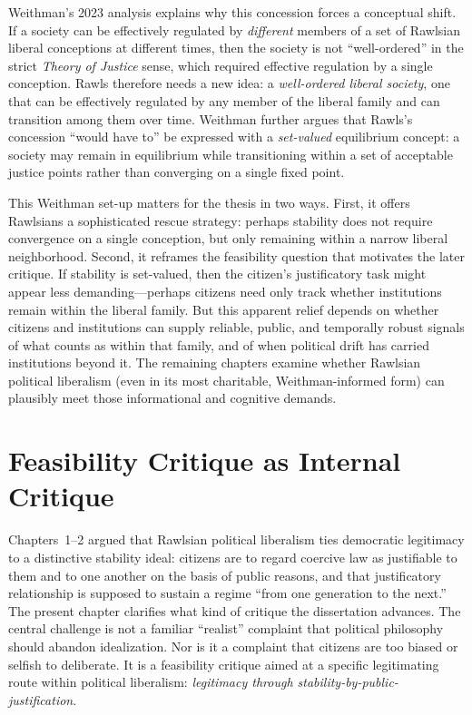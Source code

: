 \documentclass[12pt]{report}
\begin{document}
Weithman's 2023 analysis explains why this concession forces a conceptual shift. If a society can be effectively regulated by \emph{different} members of a set of Rawlsian liberal conceptions at different times, then the society is not ``well-ordered'' in the strict \emph{Theory of Justice} sense, which required effective regulation by a single conception.\parencite[p.~205]{Weithman2023FixedPoints} Rawls therefore needs a new idea: a \emph{well-ordered liberal society}, one that can be effectively regulated by any member of the liberal family and can transition among them over time.\parencite[p.~205]{Weithman2023FixedPoints} Weithman further argues that Rawls's concession ``would have to'' be expressed with a \emph{set-valued} equilibrium concept: a society may remain in equilibrium while transitioning within a set of acceptable justice points rather than converging on a single fixed point.\parencite[p.~206]{Weithman2023FixedPoints}

This Weithman set-up matters for the thesis in two ways. First, it offers Rawlsians a sophisticated rescue strategy: perhaps stability does not require convergence on a single conception, but only remaining within a narrow liberal neighborhood.\parencite[pp.~205--206]{Weithman2023FixedPoints} Second, it reframes the feasibility question that motivates the later critique. If stability is set-valued, then the citizen's justificatory task might appear less demanding---perhaps citizens need only track whether institutions remain within the liberal family. But this apparent relief depends on whether citizens and institutions can supply reliable, public, and temporally robust signals of what counts as within that family, and of when political drift has carried institutions beyond it. The remaining chapters examine whether Rawlsian political liberalism (even in its most charitable, Weithman-informed form) can plausibly meet those informational and cognitive demands.

\chapter{Feasibility Critique as Internal Critique}

Chapters~1--2 argued that Rawlsian political liberalism ties democratic legitimacy to a distinctive stability ideal: citizens are to regard coercive law as justifiable to them and to one another on the basis of public reasons, and that justificatory relationship is supposed to sustain a regime ``from one generation to the next.''\parencite[p.~1]{rawls1987overlapping} The present chapter clarifies what kind of critique the dissertation advances. The central challenge is not a familiar ``realist'' complaint that political philosophy should abandon idealization. Nor is it a complaint that citizens are too biased or selfish to deliberate. It is a feasibility critique aimed at a specific legitimating route within political liberalism: \emph{legitimacy through stability-by-public-justification}.
\end{document}
